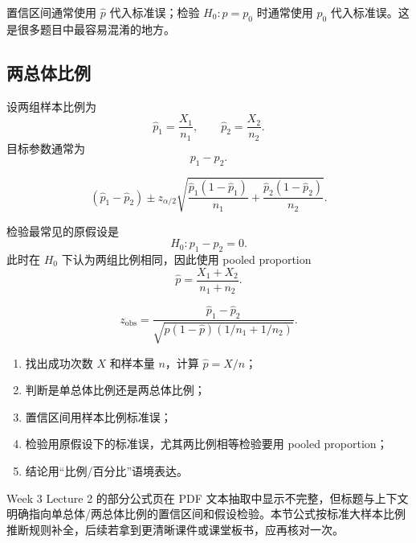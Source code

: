 \documentclass[11pt,a4paper]{article}
\theoremstyle{definition}
\theoremstyle{plain}
\theoremstyle{remark}
\begin{document}
\begin{warnbox}[比例推断中的两个标准误]
置信区间通常使用 $\hat p$ 代入标准误；检验 $H_0:p=p_0$ 时通常使用 $p_0$ 代入标准误。这是很多题目中最容易混淆的地方。
\end{warnbox}

\subsection{两总体比例}

设两组样本比例为
\[
    \hat p_1=\frac{X_1}{n_1},\qquad
    \hat p_2=\frac{X_2}{n_2}.
\]
目标参数通常为
\[
    p_1-p_2.
\]

\begin{memorybox}
\[
    \boxed{
    (\hat p_1-\hat p_2)
    \pm z_{\alpha/2}
    \sqrt{
        \frac{\hat p_1(1-\hat p_1)}{n_1}
        +
        \frac{\hat p_2(1-\hat p_2)}{n_2}
    }.
    }
\]
\end{memorybox}

检验最常见的原假设是
\[
    H_0:p_1-p_2=0.
\]
此时在 $H_0$ 下认为两组比例相同，因此使用 pooled proportion
\[
    \hat p=\frac{X_1+X_2}{n_1+n_2}.
\]

\begin{memorybox}
\[
    \boxed{
    z_{\text{obs}}
    =
    \frac{\hat p_1-\hat p_2}
    {\sqrt{\hat p(1-\hat p)(1/n_1+1/n_2)}}.
    }
\]
\end{memorybox}

\begin{methodbox}[比例题步骤]
\begin{enumerate}
    \item 找出成功次数 $X$ 和样本量 $n$，计算 $\hat p=X/n$；
    \item 判断是单总体比例还是两总体比例；
    \item 置信区间用样本比例标准误；
    \item 检验用原假设下的标准误，尤其两比例相等检验要用 pooled proportion；
    \item 结论用“比例/百分比”语境表达。
\end{enumerate}
\end{methodbox}

\begin{sourcebox}
Week 3 Lecture 2 的部分公式页在 PDF 文本抽取中显示不完整，但标题与上下文明确指向单总体/两总体比例的置信区间和假设检验。本节公式按标准大样本比例推断规则补全，后续若拿到更清晰课件或课堂板书，应再核对一次。
\end{sourcebox}
\end{document}
